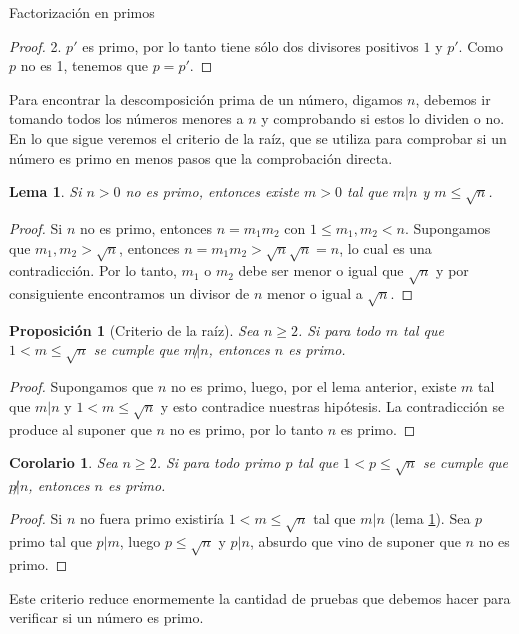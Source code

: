 \documentclass[11pt,spanish,makeidx]{amsbook}
\newtheorem{proposicion}[teorema]{Proposici\'on}
\newtheorem{corolario}[teorema]{Corolario}
\newtheorem{lema}[teorema]{Lema}
\theoremstyle{definition}
\theoremstyle{remark}
\begin{document}
\begin{section}{Factorización en primos}
\begin{proof}
2.  $p'$ es primo, por lo tanto tiene sólo dos divisores positivos $1$ y $p'$. Como $p$ no es 1, tenemos que  $p=p'$.
\end{proof}

Para encontrar la descomposición prima de un número, digamos $n$, debemos ir tomando todos los números menores a $n$ y comprobando si estos lo dividen o no. En lo que sigue veremos el criterio de la raíz, que se utiliza para comprobar si un número es primo en menos pasos que la comprobación directa.  

\begin{lema}\label{lema-criterio-raiz} Si $n>0$ no es primo, entonces existe $m>0$ tal que $m|n$ y $m \le \sqrt{n}$.  
\end{lema}
\begin{proof}
Si $n$ no es primo, entonces $n = m_1m_2$ con $1\le m_1,m_2 < n$. Supongamos que $m_1,m_2 > \sqrt n$, entonces $n = m_1m_2 >  \sqrt n\sqrt n = n$, lo cual es una contradicción. Por lo tanto, $m_1$ o $m_2$ debe ser menor o igual que $\sqrt n$ y por consiguiente encontramos un divisor de $n$ menor o igual a  $\sqrt n$. 
\end{proof}

\begin{proposicion}[Criterio de la raíz]\label{craiz}Sea $n\ge 2$. Si para todo $m$ tal que $1<m \le \sqrt{n}$ se cumple que $m{\not|}n$, entonces $n$ es primo.
\end{proposicion}
 \begin{proof}  Supongamos que $n$ no es primo, luego, por el lema anterior, existe $m$ tal que  $m|n$ y $1 < m \le \sqrt n$ y esto contradice nuestras hipótesis. La contradicción se produce al suponer que $n$ no es primo, por lo tanto $n$ es primo. 
\end{proof}

\begin{corolario}\label{coro-criterio-raiz}
	Sea $n\ge 2$. Si para todo primo  $p$ tal que $1<p \le \sqrt{n}$ se cumple que $p{\not|}n$, entonces $n$ es primo.
\end{corolario}
\begin{proof}
	Si $n$ no fuera primo existiría $1 <m \le \sqrt{n}$ tal que $m|n$ (lema \ref{lema-criterio-raiz}). Sea $p$ primo  tal que $p|m$, luego $p \le \sqrt{n}$ y $p|n$, absurdo que vino de suponer que $n$ no es primo.
\end{proof}
Este criterio reduce enormemente la cantidad de pruebas que debemos hacer para verificar si un número es primo.


\end{section}
\end{document}
